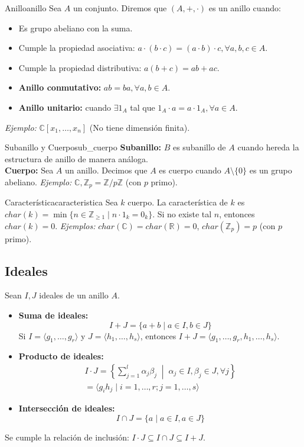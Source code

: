 \documentclass[11pt,a4paper]{article}
\begin{document}
\begin{definicion}{Anillo}{anillo}
Sea $A$ un conjunto. Diremos que $(A, +, \cdot)$ es un anillo cuando:
\begin{itemize}
    \item Es grupo abeliano con la suma.
    \item Cumple la propiedad asociativa: $a \cdot (b \cdot c) = (a \cdot b) \cdot c, \forall a,b,c \in A$.
    \item Cumple la propiedad distributiva: $a(b+c) = ab+ac$.
    \item \textbf{Anillo conmutativo:} $ab=ba, \forall a,b \in A$.
    \item \textbf{Anillo unitario:} cuando $\exists 1_A$ tal que $1_A \cdot a = a \cdot 1_A, \forall a \in A$.
\end{itemize}
\textit{Ejemplo:} $\mathbb{C}[x_1, \dots, x_n]$ (No tiene dimensión finita).
\end{definicion}

\begin{definicion}{Subanillo y Cuerpo}{sub_cuerpo}
\textbf{Subanillo:} $B$ es subanillo de $A$ cuando hereda la estructura de anillo de manera análoga.\\
\textbf{Cuerpo:} Sea $A$ un anillo. Decimos que $A$ es cuerpo cuando $A \setminus \{0\}$ es un grupo abeliano. \textit{Ejemplo:} $\mathbb{C}, \mathbb{Z}_p = \mathbb{Z}/p\mathbb{Z}$ (con $p$ primo).
\end{definicion}

\begin{definicion}{Característica}{caracteristica}
Sea $k$ cuerpo. La característica de $k$ es $char(k) = \min \{n \in \mathbb{Z}_{\ge 1} \mid n \cdot 1_k = 0_k\}$. Si no existe tal $n$, entonces $char(k)=0$.
\textit{Ejemplos:} $char(\mathbb{C})=char(\mathbb{R})=0$, $char(\mathbb{Z}_p) = p$ (con $p$ primo).
\end{definicion}

\subsection*{Ideales}
Sean $I, J$ ideales de un anillo $A$.

\begin{itemize}
    \item \textbf{Suma de ideales:}
    $$ I+J = \{a+b \mid a \in I, b \in J\} $$
    Si $I = \langle g_1, \dots, g_r \rangle$ y $J = \langle h_1, \dots, h_s \rangle$, entonces $I+J = \langle g_1, \dots, g_r, h_1, \dots, h_s \rangle$.
    \item \textbf{Producto de ideales:}
    \begin{multline*} I \cdot J = \left\{ \sum_{j=1}^l \alpha_j \beta_j \;\middle|\; \alpha_j \in I, \beta_j \in J, \forall j \right\} \\ = \langle g_i h_j \mid i=1,\dots,r; j=1,\dots,s \rangle \end{multline*}
    \item \textbf{Intersección de ideales:}
    $$ I \cap J = \{a \mid a \in I, a \in J\} $$
\end{itemize}
Se cumple la relación de inclusión: $I \cdot J \subseteq I \cap J \subseteq I+J$.
\end{document}
